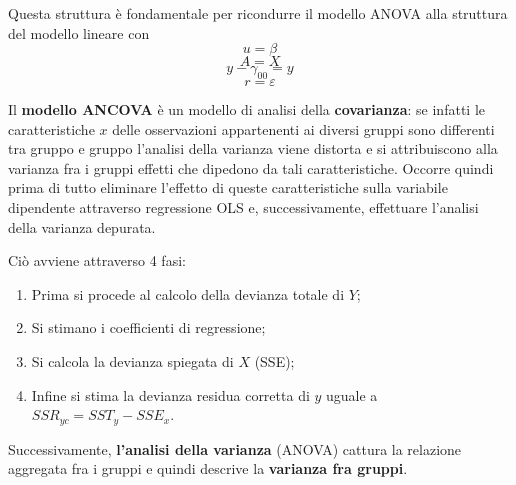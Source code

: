 \documentclass[a4page, 11pt]{article} %
\begin{document}
Questa struttura è fondamentale per ricondurre il modello ANOVA alla struttura del modello lineare con $$u = \beta$$ $$A = X$$ $$y-\gamma_{00}=y$$ $$r = \varepsilon$$

Il \textbf{modello ANCOVA} è un modello di analisi della \textbf{covarianza}: se infatti le caratteristiche $x$ delle osservazioni appartenenti ai diversi gruppi sono differenti tra gruppo e gruppo l'analisi della varianza viene distorta e si attribuiscono alla varianza fra i gruppi effetti che dipedono da tali caratteristiche. Occorre quindi prima di tutto eliminare l'effetto di queste caratteristiche sulla variabile dipendente attraverso regressione OLS e, successivamente, effettuare l'analisi della varianza depurata.

Ciò avviene attraverso 4 fasi:
\begin{enumerate}
\item Prima si procede al calcolo della devianza totale di $Y$;
\item Si stimano i coefficienti di regressione;
\item Si calcola la devianza spiegata di $X$ (SSE);
\item Infine si stima la devianza residua corretta di $y$ uguale a $SSR_{yc}=SST_y - SSE_x$.
\end{enumerate}
Successivamente, \textbf{l’analisi della varianza} (ANOVA) cattura la relazione aggregata fra i gruppi e quindi descrive la \textbf{varianza fra gruppi}.
\end{document}
